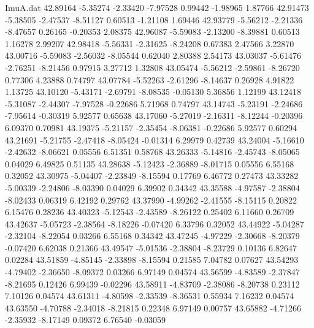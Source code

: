 \begin{filecontents}{ImuA.dat}
  42.89164   -5.35274   -2.33420   -7.97528    0.99442   -1.98965    1.87766
  42.91473   -5.38505   -2.47537   -8.51127    0.60513   -1.21108    1.69446
  42.93779   -5.56212   -2.21336   -8.47657    0.26165   -0.20353    2.08375
  42.96087   -5.59083   -2.13200   -8.39881    0.60513    1.16278    2.99207
  42.98418   -5.56331   -2.31625   -8.24208    0.67383    2.47566    3.22870
  43.00716   -5.59083   -2.56032   -8.05544    0.62040    2.80388    2.54173
  43.03037   -5.61476   -2.76251   -8.21456    0.97915    3.27712    1.32808
  43.05474   -5.56212   -2.59861   -8.26720    0.77306    4.23888    0.74797
  43.07784   -5.52263   -2.61296   -8.14637    0.26928    4.91822    1.13725
  43.10120   -5.43171   -2.69791   -8.08535   -0.05130    5.36856    1.12199
  43.12418   -5.31087   -2.44307   -7.97528   -0.22686    5.71968    0.74797
  43.14743   -5.23191   -2.24686   -7.95614   -0.30319    5.92577    0.65638
  43.17060   -5.27019   -2.16311   -8.12244   -0.20396    6.09370    0.70981
  43.19375   -5.21157   -2.35454   -8.06381   -0.22686    5.92577    0.60294
  43.21691   -5.21755   -2.47418   -8.05424   -0.01314    6.29979    0.42739
  43.24004   -5.16610   -2.42632   -8.06621    0.05556    6.51351    0.58768
  43.26333   -5.14816   -2.45743   -8.05065    0.04029    6.49825    0.51135
  43.28638   -5.12423   -2.36889   -8.01715    0.05556    6.55168    0.32052
  43.30975   -5.04407   -2.23849   -8.15594    0.17769    6.46772    0.27473
  43.33282   -5.00339   -2.24806   -8.03390    0.04029    6.39902    0.34342
  43.35588   -4.97587   -2.38804   -8.02433    0.06319    6.42192    0.29762
  43.37990   -4.99262   -2.41555   -8.15115    0.20822    6.15476    0.28236
  43.40323   -5.12543   -2.43589   -8.26122    0.25402    6.11660    0.26709
  43.42637   -5.05723   -2.38564   -8.18226   -0.07420    6.33796    0.32052
  43.44922   -5.04287   -2.32104   -8.22054    0.03266    6.55168    0.34342
  43.47245   -4.97229   -2.30668   -8.20379   -0.07420    6.62038    0.21366
  43.49547   -5.01536   -2.38804   -8.23729    0.10136    6.82647    0.02284
  43.51859   -4.85145   -2.33898   -8.15594    0.21585    7.04782    0.07627
  43.54293   -4.79402   -2.36650   -8.09372    0.03266    6.97149    0.04574
  43.56599   -4.83589   -2.37847   -8.21695    0.12426    6.99439   -0.02296
  43.58911   -4.83709   -2.38086   -8.20738    0.23112    7.10126    0.04574
  43.61311   -4.80598   -2.33539   -8.36531    0.55934    7.16232    0.04574
  43.63550   -4.70788   -2.34018   -8.21815    0.22348    6.97149    0.00757
  43.65882   -4.71266   -2.35932   -8.17149    0.09372    6.76540   -0.03059

\end{filecontents}
